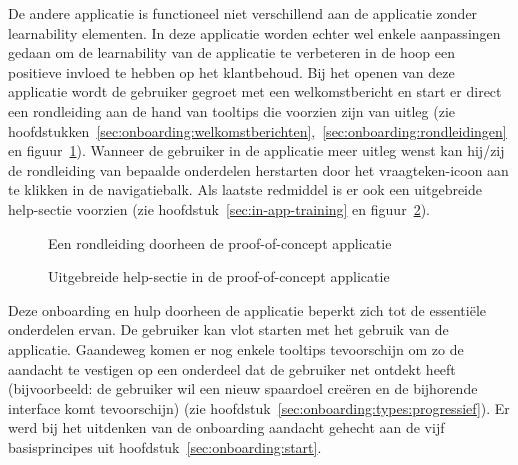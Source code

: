 De andere applicatie is functioneel niet verschillend aan de applicatie zonder learnability elementen. In deze applicatie worden echter wel enkele aanpassingen gedaan om de learnability van de applicatie te verbeteren in de hoop een positieve invloed te hebben op het klantbehoud. Bij het openen van deze applicatie wordt de gebruiker gegroet met een welkomstbericht en start er direct een rondleiding aan de hand van tooltips die voorzien zijn van uitleg (zie hoofdstukken~\ref{sec:onboarding:welkomstberichten},~\ref{sec:onboarding:rondleidingen} en figuur~\ref{fig:piggy:onboarding}). Wanneer de gebruiker in de applicatie meer uitleg wenst kan hij/zij de rondleiding van bepaalde onderdelen herstarten door het vraagteken-icoon aan te klikken in de navigatiebalk. Als laatste redmiddel is er ook een uitgebreide help-sectie voorzien (zie hoofdstuk~\ref{sec:in-app-training} en figuur~\ref{fig:piggy:help}).

\begin{figure}[h!]
    \centering
    \qquad
    \caption{Een rondleiding doorheen de proof-of-concept applicatie}
    \label{fig:piggy:onboarding}
\end{figure}

\begin{figure}[h!]
    \centering
    \qquad
    \caption{Uitgebreide help-sectie in de proof-of-concept applicatie}
    \label{fig:piggy:help}
\end{figure}

Deze onboarding en hulp doorheen de applicatie beperkt zich tot de essentiële onderdelen ervan. De gebruiker kan vlot starten met het gebruik van de applicatie. Gaandeweg komen er nog enkele tooltips tevoorschijn om zo de aandacht te vestigen op een onderdeel dat de gebruiker net ontdekt heeft (bijvoorbeeld: de gebruiker wil een nieuw spaardoel creëren en de bijhorende interface komt tevoorschijn) (zie hoofdstuk~\ref{sec:onboarding:types:progressief}). Er werd bij het uitdenken van de onboarding aandacht gehecht aan de vijf basisprincipes uit hoofdstuk~\ref{sec:onboarding:start}.

